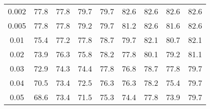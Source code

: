 \begin{table}[H]
\begin{tabular}{|c||gg|gg|gg|gg|}
    0.002 & 77.8 & 77.8 & 79.7 & 79.7 & 82.6 & 82.6 & 82.6 & 82.6 \\
    0.005 & 77.8 & 77.8 & 79.2 & 79.7 & 81.2 & 82.6 & 81.6 & 82.6 \\
    0.01 & 75.4 & 77.2 & 77.8 & 78.7 & 79.7 & 82.1 & 80.7 & 82.1 \\
    0.02 & 73.9 & 76.3 & 75.8 & 78.2 & 77.8 & 80.1 & 79.2 & 81.1 \\
    0.03 & 72.9 & 74.3 & 74.4 & 77.8 & 76.8 & 78.7 & 77.8 & 79.7 \\
    0.04 & 70.5 & 73.4 & 72.5 & 76.3 & 76.3 & 78.2 & 75.4 & 79.7 \\
    0.05 & 68.6 & 73.4 & 71.5 & 75.3 & 74.4 & 77.8 & 73.9 & 79.7 \\
    \hline
  \end{tabular}
\end{table}

